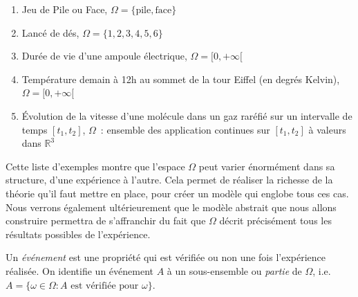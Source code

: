 \begin{exemple}\label{I-exemples-1}
\begin{enumerate}
\def\labelenumi{\arabic{enumi}.}
\tightlist
\item
  Jeu de Pile ou Face, \(\Omega = \{\text{pile}, \text{face}\}\)
\item
  Lancé de dés, \(\Omega = \{1,2,3,4,5,6\}\)
\item
  Durée de vie d'une ampoule électrique, \(\Omega = [0,+\infty [\)
\item
  Température demain à 12h au sommet de la tour Eiffel (en degrés
  Kelvin), \(\Omega = [0,+\infty [\)
\item
  Évolution de la vitesse d'une molécule dans un gaz raréfié sur un
  intervalle de temps \([t_1,t_2]\), \(\Omega\)~: ensemble des
  application continues sur \([t_1,t_2]\) à valeurs dans
  \(\mathbb{R}^3\)
\end{enumerate}

Cette liste d'exemples montre que l'espace \(\Omega\) peut varier
énormément dans sa structure, d'une expérience à l'autre. Cela permet de
réaliser la richesse de la théorie qu'il faut mettre en place, pour
créer un modèle qui englobe tous ces cas. Nous verrons également
ultérieurement que le modèle abstrait que nous allons construire
permettra de s'affranchir du fait que \(\Omega\) décrit précisément tous
les résultats possibles de l'expérience.
\end{exemple}

\begin{definition}[{Evénement}]\label{I-evuxe9nement}

Un \emph{événement} est une propriété qui est vérifiée ou non une fois
l'expérience réalisée. On identifie un événement \(A\) à un
sous-ensemble ou \emph{partie} de \(\Omega\),
i.e.~\(A = \{\omega \in \Omega : A \text{ est vérifiée pour } \omega \}\).
\end{definition}

